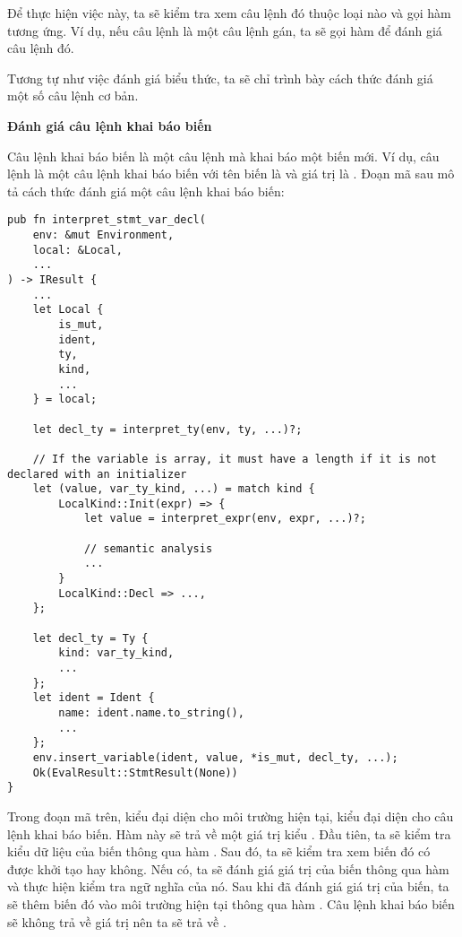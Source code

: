     Để thực hiện việc này, ta sẽ kiểm tra xem câu lệnh đó thuộc loại nào và gọi hàm tương ứng. Ví dụ, nếu câu lệnh là một câu lệnh gán, ta sẽ gọi hàm  để đánh giá câu lệnh đó.

    Tương tự như việc đánh giá biểu thức, ta sẽ chỉ trình bày cách thức đánh giá một số câu lệnh cơ bản.

\noindent \textbf{Đánh giá câu lệnh khai báo biến}

    Câu lệnh khai báo biến là một câu lệnh mà khai báo một biến mới. Ví dụ, câu lệnh  là một câu lệnh khai báo biến với tên biến là  và giá trị là . Đoạn mã sau mô tả cách thức đánh giá một câu lệnh khai báo biến:

\begin{lstlisting}[]
pub fn interpret_stmt_var_decl(
    env: &mut Environment,
    local: &Local,
    ...
) -> IResult {
    ...
    let Local {
        is_mut,
        ident,
        ty,
        kind,
        ...
    } = local;

    let decl_ty = interpret_ty(env, ty, ...)?;

    // If the variable is array, it must have a length if it is not declared with an initializer
    let (value, var_ty_kind, ...) = match kind {
        LocalKind::Init(expr) => {
            let value = interpret_expr(env, expr, ...)?;

            // semantic analysis
            ...
        }
        LocalKind::Decl => ...,
    };

    let decl_ty = Ty {
        kind: var_ty_kind,
        ...
    };
    let ident = Ident {
        name: ident.name.to_string(),
        ...
    };
    env.insert_variable(ident, value, *is_mut, decl_ty, ...);
    Ok(EvalResult::StmtResult(None))
}
\end{lstlisting}

    Trong đoạn mã trên,  kiểu  đại diện cho môi trường hiện tại,  kiểu  đại diện cho câu lệnh khai báo biến. Hàm này sẽ trả về một giá trị kiểu . Đầu tiên, ta sẽ kiểm tra kiểu dữ liệu của biến thông qua hàm . Sau đó, ta sẽ kiểm tra xem biến đó có được khởi tạo hay không. Nếu có, ta sẽ đánh giá giá trị của biến thông qua hàm  và thực hiện kiểm tra ngữ nghĩa của nó. Sau khi đã đánh giá giá trị của biến, ta sẽ thêm biến đó vào môi trường hiện tại thông qua hàm . Câu lệnh khai báo biến sẽ không trả về giá trị nên ta sẽ trả về .

